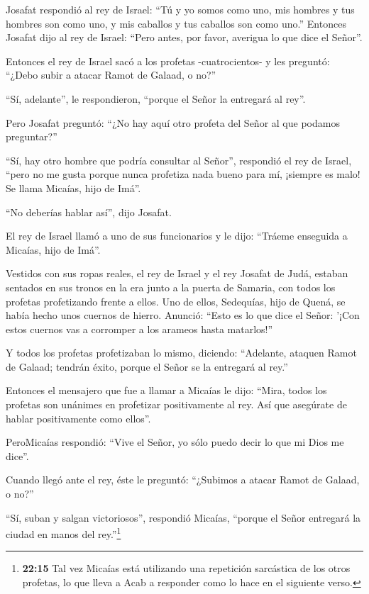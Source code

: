 Josafat respondió al rey de Israel: ``Tú y yo somos como uno, mis
hombres y tus hombres son como uno, y mis caballos y tus caballos son
como uno.''  Entonces Josafat dijo al rey de Israel: ``Pero
antes, por favor, averigua lo que dice el Señor''.

 Entonces el rey de Israel sacó a los profetas
-cuatrocientos- y les preguntó: ``¿Debo subir a atacar Ramot de Galaad,
o no?''

``Sí, adelante'', le respondieron, ``porque el Señor la entregará al
rey''.

 Pero Josafat preguntó: ``¿No hay aquí otro profeta del
Señor al que podamos preguntar?''

 ``Sí, hay otro hombre que podría consultar al Señor'',
respondió el rey de Israel, ``pero no me gusta porque nunca profetiza
nada bueno para mí, ¡siempre es malo! Se llama Micaías, hijo de Imá''.

``No deberías hablar así'', dijo Josafat.

 El rey de Israel llamó a uno de sus funcionarios y le dijo:
``Tráeme enseguida a Micaías, hijo de Imá''.

 Vestidos con sus ropas reales, el rey de Israel y el rey
Josafat de Judá, estaban sentados en sus tronos en la era junto a la
puerta de Samaria, con todos los profetas profetizando frente a ellos.
 Uno de ellos, Sedequías, hijo de Quená, se había hecho
unos cuernos de hierro. Anunció: ``Esto es lo que dice el Señor: '¡Con
estos cuernos vas a corromper a los arameos hasta matarlos!''

 Y todos los profetas profetizaban lo mismo, diciendo:
``Adelante, ataquen Ramot de Galaad; tendrán éxito, porque el Señor se
la entregará al rey.''

 Entonces el mensajero que fue a llamar a Micaías le dijo:
``Mira, todos los profetas son unánimes en profetizar positivamente al
rey. Así que asegúrate de hablar positivamente como ellos''.

 PeroMicaías respondió: ``Vive el Señor, yo sólo puedo
decir lo que mi Dios me dice''.

 Cuando llegó ante el rey, éste le preguntó: ``¿Subimos a
atacar Ramot de Galaad, o no?''

``Sí, suban y salgan victoriosos'', respondió Micaías, ``porque el Señor
entregará la ciudad en manos del rey.''\footnote{\textbf{22:15} Tal vez
  Micaías está utilizando una repetición sarcástica de los otros
  profetas, lo que lleva a Acab a responder como lo hace en el siguiente
  verso.}

